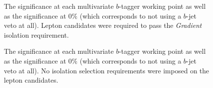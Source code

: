 \begin{figure}
\caption{The significance at each multivariate $b$-tagger working point as well as the significance at $0\%$ (which corresponds to not using a $b$-jet veto at all). Lepton candidates were required to pass the \textit{Gradient} isolation requirement.}
\label{optimal_b-tagging_working_point_wGrad}
\end{figure}
\begin{figure}
\caption{The significance at each multivariate $b$-tagger working point as well as the significance at $0\%$ (which corresponds to not using a $b$-jet veto at all). No isolation selection requirements were imposed on the lepton candidates.}
\label{optimal_b-tagging_working_point_noIso}
\end{figure}
